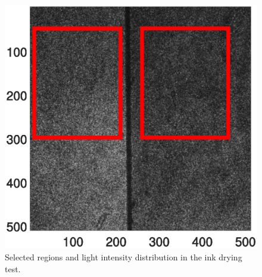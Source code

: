 \documentclass[review]{elsarticle}
\begin{document}
\begin{figure}[h!]
\centering
\includegraphics[width=0.85\columnwidth]{meanall_points_all.eps}
\caption{Selected regions and light intensity distribution in the ink drying test.}
\label{fig:regions}
\end{figure}
\end{document}
